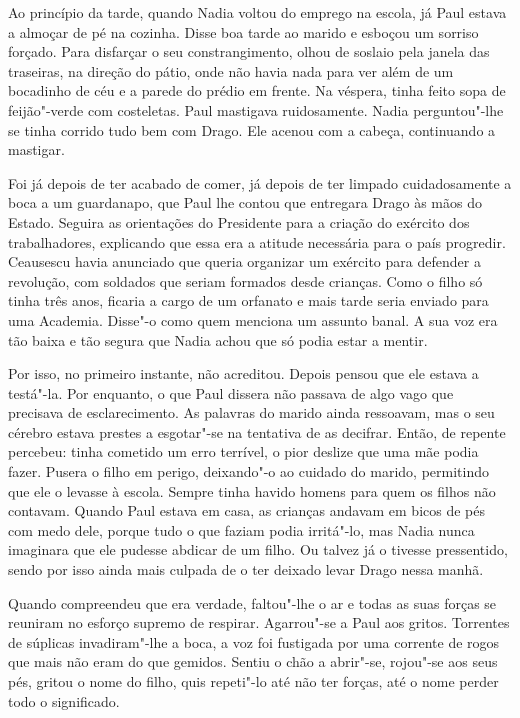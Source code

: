 Ao princípio da tarde, quando Nadia voltou do emprego na escola, já Paul
estava a almoçar de pé na cozinha. Disse boa tarde ao marido e esboçou
um sorriso forçado. Para disfarçar o seu constrangimento, olhou de
soslaio pela janela das traseiras, na direção do pátio, onde não havia
nada para ver além de um bocadinho de céu e a parede do prédio em
frente. Na véspera, tinha feito sopa de feijão"-verde com costeletas. Paul mastigava ruidosamente. Nadia perguntou"-lhe
se tinha corrido tudo bem com Drago. Ele acenou com a cabeça,
continuando a mastigar.

Foi já depois de ter acabado de comer, já depois de ter limpado
cuidadosamente a boca a um guardanapo, que Paul lhe contou que entregara
Drago às mãos do Estado. Seguira as orientações do Presidente para a
criação do exército dos trabalhadores, explicando que essa era a atitude necessária para o país progredir. Ceausescu havia anunciado que
queria organizar um exército para defender a revolução, com soldados que
seriam formados desde crianças. Como o filho só tinha três anos, ficaria
a cargo de um orfanato e mais tarde seria enviado para uma Academia.
Disse"-o como quem menciona um assunto banal. A sua voz era tão baixa e
tão segura que Nadia achou que só podia estar a mentir.

Por isso, no primeiro instante, não acreditou. Depois
pensou que ele estava a testá"-la. Por enquanto, o que Paul dissera não
passava de algo vago que precisava de esclarecimento. As palavras do
marido ainda ressoavam, mas o seu cérebro estava prestes a esgotar"-se na
tentativa de as decifrar. Então, de repente percebeu: tinha cometido um
erro terrível, o pior deslize que uma mãe podia fazer.
Pusera o filho em perigo, deixando"-o ao cuidado do marido, permitindo
que ele o levasse à escola. Sempre tinha havido homens para quem os
filhos não contavam. Quando Paul estava em casa, as crianças andavam em
bicos de pés com medo dele, porque tudo o que faziam podia irritá"-lo,
mas Nadia nunca imaginara que ele pudesse abdicar de um filho. Ou talvez
já o tivesse pressentido, sendo por isso ainda mais culpada de o ter
deixado levar Drago nessa manhã.

Quando compreendeu que era verdade, faltou"-lhe o ar e todas as suas
forças se reuniram no esforço supremo de respirar. Agarrou"-se a Paul aos
gritos. Torrentes de súplicas invadiram"-lhe a boca, a voz foi fustigada
por uma corrente de rogos que mais não eram do que gemidos. Sentiu o
chão a abrir"-se, rojou"-se aos seus pés, gritou o nome do filho, quis
repeti"-lo até não ter forças, até o nome perder todo o significado.

